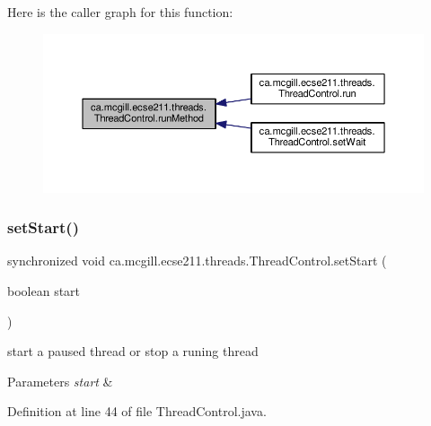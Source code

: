 Here is the caller graph for this function\+:
\nopagebreak
\begin{figure}[H]
\begin{center}
\leavevmode
\includegraphics[width=350pt]{classca_1_1mcgill_1_1ecse211_1_1threads_1_1_thread_control_a2959c54bdb6c62c9d5569cdf3ccf2418_icgraph}
\end{center}
\end{figure}
\mbox{\label{classca_1_1mcgill_1_1ecse211_1_1threads_1_1_thread_control_a16221cdc4ccf637b190934549c708e1f}} 
\subsubsection{\texorpdfstring{set\+Start()}{setStart()}}
{\footnotesize\ttfamily synchronized void ca.\+mcgill.\+ecse211.\+threads.\+Thread\+Control.\+set\+Start (\begin{DoxyParamCaption}\item[{boolean}]{start }\end{DoxyParamCaption})}

start a paused thread or stop a runing thread 
\begin{DoxyParams}{Parameters}
{\em start} & \\
\hline
\end{DoxyParams}


Definition at line 44 of file Thread\+Control.\+java.



